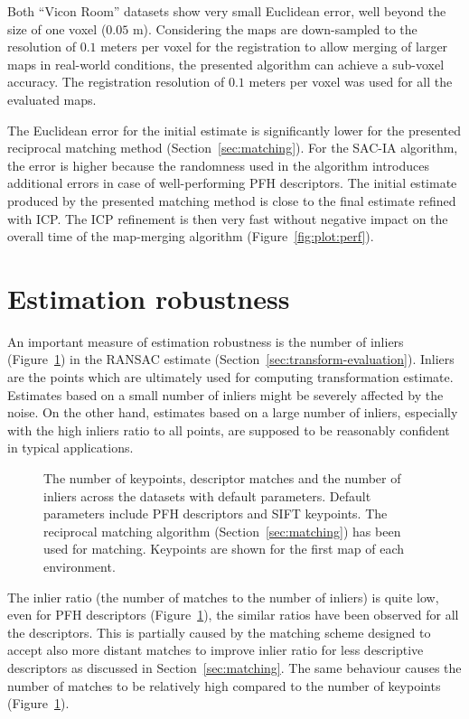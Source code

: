 Both ``Vicon Room'' datasets show very small Euclidean error, well beyond the size of one voxel ($0.05$ m). Considering the maps are down-sampled to the resolution of $0.1$ meters per voxel for the registration to allow merging of larger maps in real-world conditions, the presented algorithm can achieve a sub-voxel accuracy. The registration resolution of $0.1$ meters per voxel was used for all the evaluated maps.

The Euclidean error for the initial estimate is significantly lower for the presented reciprocal matching method (Section~\ref{sec:matching}). For the \gls{SAC-IA} algorithm, the error is higher because the randomness used in the algorithm introduces additional errors in case of well-performing \gls{PFH} descriptors. The initial estimate produced by the presented matching method is close to the final estimate refined with \gls{ICP}. The \gls{ICP} refinement is then very fast without negative impact on the overall time of the map-merging algorithm (Figure~\ref{fig:plot:perf}).

\section{Estimation robustness}

An important measure of estimation robustness is the number of inliers (Figure~\ref{fig:plot:inliers}) in the \gls{RANSAC} estimate (Section~\ref{sec:transform-evaluation}). Inliers are the points which are ultimately used for computing transformation estimate. Estimates based on a small number of inliers might be severely affected by the noise. On the other hand, estimates based on a large number of inliers, especially with the high inliers ratio to all points, are supposed to be reasonably confident in typical applications.

\begin{figure}
  \centering
  
  \caption[The number of keypoints, matches and inliers for aerial datasets]{The number of keypoints, descriptor matches and the number of inliers across the datasets with default parameters. Default parameters include \gls{PFH} descriptors and \gls{SIFT} keypoints. The reciprocal matching algorithm (Section~\ref{sec:matching}) has been used for matching. Keypoints are shown for the first map of each environment.}
  \label{fig:plot:inliers}
\end{figure}

The inlier ratio (the number of matches to the number of inliers) is quite low, even for \gls{PFH} descriptors (Figure~\ref{fig:plot:inliers}), the similar ratios have been observed for all the descriptors. This is partially caused by the matching scheme designed to accept also more distant matches to improve inlier ratio for less descriptive descriptors as discussed in Section~\ref{sec:matching}. The same behaviour causes the number of matches to be relatively high compared to the number of keypoints (Figure~\ref{fig:plot:inliers}).

